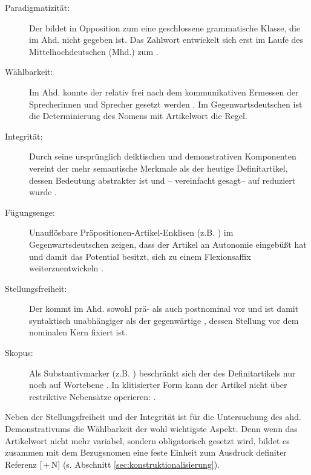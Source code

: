 \begin{description}
\item[Paradigmatizität:]\sloppy Der  bildet in Opposition zum  eine geschlossene grammatische Klasse, die im Ahd. nicht gegeben ist. Das Zahlwort  entwickelt sich erst im Laufe des Mittelhochdeutschen (Mhd.) zum  \parencite{Szczepaniak2016}. 
\item[Wählbarkeit:] Im Ahd. konnte der  relativ frei nach dem kommunikativen Ermessen der Sprecherinnen und Sprecher gesetzt werden \parencite{Oubouzar1992}. Im Gegenwartsdeutschen ist die Determinierung des Nomens mit Artikelwort die Regel. 
\item[Integrität:] Durch seine ursprünglich deiktischen und demonstrativen Komponenten vereint der  mehr semantische Merkmale als der heutige Definitartikel, dessen Bedeutung abstrakter ist und -- vereinfacht gesagt-- auf  reduziert wurde \parencite[41]{Lehmann2015}.
\item[Fügungsenge:] Unauflösbare Präpositionen-Artikel-Enklisen (z.B. )  im Gegenwartsdeutschen zeigen, dass der Artikel an Autonomie eingebüßt hat und damit das Potential besitzt, sich zu einem Flexionsaffix  weiterzuentwickeln \parencite[s. hierzu][]{Nubling1992,Nubling2005}.  
\item[Stellungsfreiheit:] Der  kommt im Ahd. sowohl prä- als auch postnominal vor \parencite[27--28]{Schrodt2004} und ist damit syntaktisch unabhängiger als der gegenwärtige , dessen Stellung vor dem nominalen Kern fixiert ist. 
\item[Skopus:] Als Substantivmarker (z.B. ) beschränkt sich der  des Definitartikels nur noch auf Wortebene \parencite[71]{Szczepaniak2011a}. In klitisierter Form  kann der Artikel nicht über restriktive Nebensätze operieren:  \parencite[112]{Nubling2005}.
\end{description}

\noindent
Neben der Stellungsfreiheit  und der Integrität ist für die Untersuchung des ahd. Demonstrativums  die Wählbarkeit der wohl wichtigste Aspekt. Denn wenn das Artikelwort nicht mehr variabel, sondern obligatorisch gesetzt wird, bildet es zusammen mit dem Bezugsnomen eine feste Einheit zum Ausdruck definiter Referenz  [\,+\,N] (s. Abschnitt \ref{sec:konstruktionalisierung}). 

